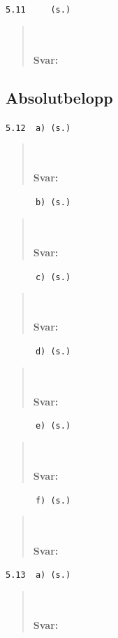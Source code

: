 \documentclass[a4paper]{article}
\newcommand{\tskcol}[1]{\textcolor{tskcol}{#1}}
\begin{document}
	\texttt{\tskcol{5.11~~~~ (s.)}}
	\begin{quotation}
		\noindent
		\\ \\
		\textbf{Svar:}
	\end{quotation}
	
	\subsection*{Absolutbelopp}
	
	\texttt{\tskcol{5.12~~a) (s.)}}
	\begin{quotation}
		\noindent
		\\ \\
		\textbf{Svar:}
	\end{quotation}
	
	\texttt{\tskcol{~~~~~~b) (s.)}}
	\begin{quotation}
		\noindent
		\\ \\
		\textbf{Svar:}
	\end{quotation}
	
	\texttt{\tskcol{~~~~~~c) (s.)}}
	\begin{quotation}
		\noindent
		\\ \\
		\textbf{Svar:}
	\end{quotation}
	
	\texttt{\tskcol{~~~~~~d) (s.)}}
	\begin{quotation}
		\noindent
		\\ \\
		\textbf{Svar:}
	\end{quotation}
	
	\texttt{\tskcol{~~~~~~e) (s.)}}
	\begin{quotation}
		\noindent
		\\ \\
		\textbf{Svar:}
	\end{quotation}
	
	\texttt{\tskcol{~~~~~~f) (s.)}}
	\begin{quotation}
		\noindent
		\\ \\
		\textbf{Svar:}
	\end{quotation}
	
	\texttt{\tskcol{5.13~~a) (s.)}}
	\begin{quotation}
		\noindent
		\\ \\
		\textbf{Svar:}
	\end{quotation}
	
\end{document}
